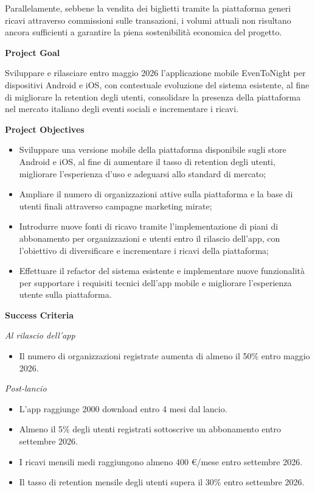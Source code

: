 \documentclass[11pt,a4paper]{article}
\providecommand{\tightlist}{\setlength{\itemsep}{0pt}\setlength{\parskip}{0pt}}
\begin{document}
Parallelamente, sebbene la vendita dei biglietti tramite la piattaforma generi ricavi attraverso commissioni sulle transazioni, i volumi attuali non risultano ancora sufficienti a garantire la piena sostenibilità economica del progetto.

\medskip\noindent\textbf{Project Goal}\par\smallskip
Sviluppare e rilasciare entro maggio 2026 l’applicazione mobile EvenToNight per dispositivi Android e iOS, con contestuale evoluzione del sistema esistente, al fine di migliorare la retention degli utenti, consolidare la presenza della piattaforma nel mercato italiano degli eventi sociali e incrementare i ricavi.

\medskip\noindent\textbf{Project Objectives}
\begin{itemize}
\tightlist
\item Sviluppare una versione mobile della piattaforma disponibile sugli store Android e iOS, al fine di aumentare il tasso di retention degli utenti, migliorare l’esperienza d’uso e adeguarsi allo standard di mercato;
\item Ampliare il numero di organizzazioni attive sulla piattaforma e la base di utenti finali attraverso campagne marketing mirate;
\item Introdurre nuove fonti di ricavo tramite l’implementazione di piani di abbonamento per organizzazioni e utenti entro il rilascio dell’app, con l’obiettivo di diversificare e incrementare i ricavi della piattaforma;
\item Effettuare il refactor del sistema esistente e implementare nuove funzionalità per supportare i requisiti tecnici dell’app mobile e migliorare l’esperienza utente sulla piattaforma.
\end{itemize}

\medskip\noindent\textbf{Success Criteria}\par\smallskip

\noindent\textit{Al rilascio dell’app}
\begin{itemize}
\tightlist
\item Il numero di organizzazioni registrate aumenta di almeno il 50\% entro maggio 2026.
\end{itemize}

\noindent\textit{Post-lancio}
\begin{itemize}
\tightlist
\item L’app raggiunge 2000 download entro 4 mesi dal lancio.
\item Almeno il 5\% degli utenti registrati sottoscrive un abbonamento entro settembre 2026.
\item I ricavi mensili medi raggiungono almeno 400 €/mese entro settembre 2026.
\item Il tasso di retention mensile degli utenti supera il 30\% entro settembre 2026.
\end{itemize}
\end{document}
